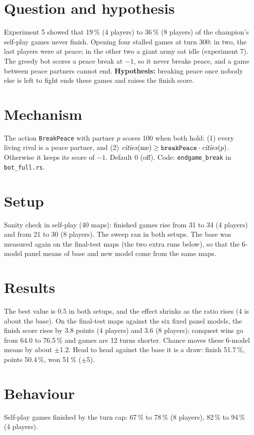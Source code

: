 \documentclass{../polyexp}
\begin{document}

\ExpHeader

\section{Question and hypothesis}
Experiment 5 showed that 19\,\% (4 players) to 36\,\% (8 players) of the champion's self-play games never finish. Opening four stalled games at turn 300: in two, the last players were at peace; in the other two a giant army sat idle (experiment 7). The greedy bot scores a peace break at $-1$, so it never breaks peace, and a game between peace partners cannot end. \textbf{Hypothesis:} breaking peace once nobody else is left to fight ends these games and raises the finish score.

\section{Mechanism}
The action \texttt{BreakPeace} with partner $p$ scores 100 when both hold: (1) every living rival is a peace partner, and (2) $\mathit{cities}(\text{me}) \ge \texttt{breakPeace}\cdot\mathit{cities}(p)$. Otherwise it keeps its score of $-1$. Default 0 (off). Code: \texttt{endgame\_break} in \texttt{bot\_full.rs}.

\section{Setup}
Sanity check in self-play (40 maps): finished games rise from 31 to 34 (4 players) and from 21 to 30 (8 players). The sweep ran in both setups. The base was measured again on the final-test maps (the two extra runs below), so that the 6-model panel means of base and new model come from the same maps.

\section{Results}
\ExpResults

The best value is 0.5 in both setups, and the effect shrinks as the ratio rises (4 is about the base). On the final-test maps against the six fixed panel models, the finish score rises by 3.8 points (4 players) and 3.6 (8 players); conquest wins go from 64.0 to 76.5\,\% and games are 12 turns shorter. Chance moves these 6-model means by about $\pm$1.2. Head to head against the base it is a draw: finish 51.7\,\%, points 50.4\,\%, won 51\,\% ($\pm$5).

\section{Behaviour}
Self-play games finished by the turn cap: 67\,\% to 78\,\% (8 players), 82\,\% to 94\,\% (4 players).
\end{document}
